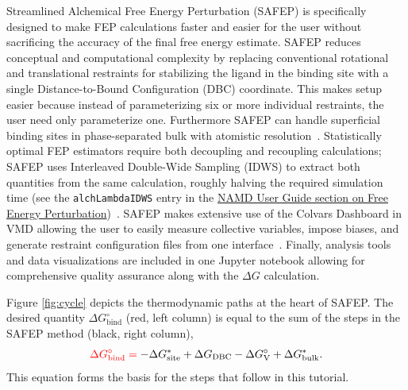 \documentclass[9pt,tutorial,pubversion]{Styling/livecoms}
\newcommand{\textInput}[1]{\texttt{#1}}
\begin{document}
Streamlined Alchemical Free Energy Perturbation (SAFEP) is specifically designed to make FEP calculations faster and easier for the user without sacrificing the accuracy of the final free energy estimate.
SAFEP reduces conceptual and computational complexity by replacing conventional rotational and translational restraints for stabilizing the ligand in the binding site with a single Distance-to-Bound Configuration (DBC) coordinate.
This makes setup easier because instead of parameterizing six or more individual restraints, the user need only parameterize one.
Furthermore SAFEP can handle superficial binding sites in phase-separated bulk with atomistic resolution~\cite{Salari2018}.
Statistically optimal FEP estimators require both decoupling and recoupling calculations; SAFEP uses Interleaved Double-Wide Sampling (IDWS) to extract both quantities from the same calculation, roughly halving the required simulation time (see the \textInput{alchLambdaIDWS} entry in the \href{https://www.ks.uiuc.edu/Research/namd/2.14/ug/node64.html}{NAMD User Guide section on Free Energy Perturbation})~\cite{Bernardi2020}.
SAFEP makes extensive use of the Colvars Dashboard in VMD allowing the user to easily measure collective variables, impose biases, and generate restraint configuration files from one interface~\cite{Henin2022}. 
Finally, analysis tools and data visualizations are included in one Jupyter notebook allowing for comprehensive quality assurance along with the $\Delta G$ calculation.

Figure \ref{fig:cycle} depicts the thermodynamic paths at the heart of SAFEP. 
The desired quantity $\Delta G^\circ_\mathrm{bind}$ (red, left column) is equal to the sum of the steps in the SAFEP method (black, right column), 
\begin{equation}\label{eq:overalldG}
    \color{red} \Delta G^\circ_\mathrm{bind} = \color{black} - \Delta G_\mathrm{site}^* + \Delta G_\mathrm{DBC} - \Delta G^\circ_\mathrm{V} + \Delta G^*_\mathrm{bulk} . 
\end{equation}
\noindent This equation forms the basis for the steps that follow in this tutorial. 
\end{document}
